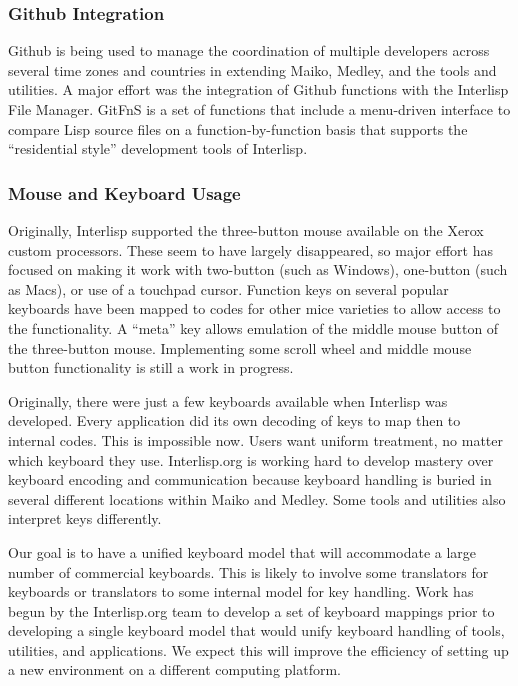 \documentclass[sigconf]{acmart}
\begin{document}
\subsubsection{Github Integration}

Github is being used to manage the coordination of multiple developers across several time zones and countries in extending Maiko, Medley, and the tools and utilities. A major effort was the integration of Github functions with the Interlisp File Manager. GitFnS is a set of functions that include a menu-driven interface to compare Lisp source files on a function-by-function basis that supports the ``residential style'' development tools of Interlisp.

\subsubsection{Mouse and Keyboard Usage}

Originally, Interlisp supported the three-button mouse available on the Xerox custom processors. These seem to have largely disappeared, so major effort has focused on making it work with two-button (such as Windows), one-button (such as Macs), or use of a touchpad cursor. Function keys on several popular keyboards have been mapped to codes for other mice varieties to allow access to the functionality. A ``meta'' key allows emulation of the middle mouse button of the three-button mouse. Implementing some scroll wheel and middle mouse button functionality is still a work in progress.

Originally, there were just a few keyboards available when Interlisp was developed. Every application did its own decoding of keys to map then to internal codes. This is impossible now. Users want uniform treatment, no matter which keyboard they use. Interlisp.org is working hard to develop mastery over keyboard encoding and communication because keyboard handling is buried in several different locations within Maiko and Medley. Some tools and utilities also interpret keys differently.

Our goal is to have a unified keyboard model that will accommodate a large number of commercial keyboards. This is likely to involve some translators for keyboards or translators to some internal model for key handling. Work has begun by the Interlisp.org team to develop a set of keyboard mappings prior to developing a single keyboard model that would unify keyboard handling of tools, utilities, and applications. We expect this will improve the efficiency of setting up a new environment on a different computing platform.
\end{document}
